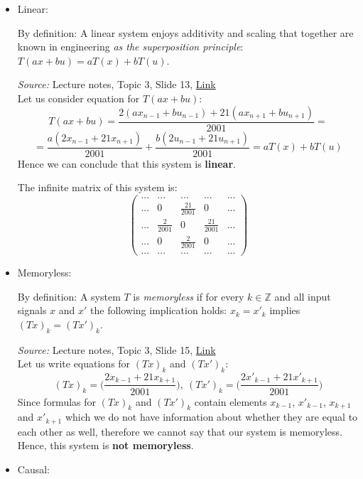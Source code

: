\documentclass{article}
\begin{document}
\begin{itemize}
    \item Linear:
    
    By definition: A linear system enjoys additivity and scaling that together are known in engineering \emph{as the superposition principle}: $T(ax+bu)=aT(x)+bT(u)$.
    
    \emph{Source:} Lecture notes, Topic 3, Slide 13, \href{https://moodle.innopolis.university/pluginfile.php/142933/mod_resource/content/1/DSPt3spr22.pdf}{Link}\\
    
    Let us consider equation for $T(ax+bu)$:
    $$T(ax+bu)=\frac{2(ax_{n-1}+bu_{n-1})+21(ax_{n+1}+bu_{n+1})}{2001}=$$$$=\frac{a(2x_{n-1}+21x_{n+1})}{2001}+\frac{b(2u_{n-1}+21u_{n+1})}{2001}=aT(x)+bT(u)$$
    Hence we can conclude that this system is \textbf{linear}.
    
    The infinite matrix of this system is:
    $$\begin{pmatrix}
    ... & ... & ... & ... & ...\\
    ... & 0 & \frac{21}{2001} & 0 & ...\\
    ... & \frac{2}{2001} & 0 & \frac{21}{2001} & ...\\
    ... & 0 & \frac{2}{2001} & 0 & ...\\
    ... & ... & ... & ... & ...
    \end{pmatrix}$$
    
    \item Memoryless:
    
    By definition: A system $T$ is \emph{memoryless} if for every $k\in\mathbb{Z}$ and all input signals $x$ and $x'$ the following implication holds: $x_k=x'_k$ implies $(Tx)_k=(Tx')_k$.
    
    \emph{Source:} Lecture notes, Topic 3, Slide 15, \href{https://moodle.innopolis.university/pluginfile.php/142933/mod_resource/content/1/DSPt3spr22.pdf}{Link}\\
        Let us write equations for $(Tx)_k$ and $(Tx')_k$:
    $$(Tx)_k=\Big(\frac{2x_{k-1}+21x_{k+1}}{2001}\Big),\ (Tx')_k=\Big(\frac{2x'_{k-1}+21x'_{k+1}}{2001}\Big)$$
    Since formulas for $(Tx)_k$ and $(Tx')_k$ contain elements $x_{k-1}$, $x'_{k-1}$, $x_{k+1}$ and $x'_{k+1}$ which we do not have information about whether they are equal to each other as well, therefore we cannot say that our system is memoryless. Hence, this system is \textbf{not memoryless}.

    \item Causal:
    

\end{itemize}
\end{document}
